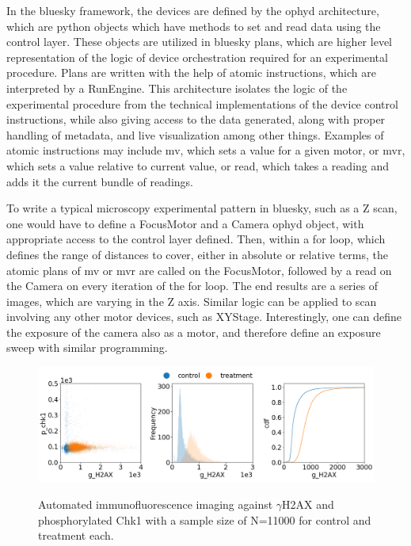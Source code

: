 In the bluesky framework, the devices are defined by the ophyd architecture, which are python objects which have methods to set and read data using the control layer. These objects are utilized in bluesky plans, which are higher level representation of the logic of device orchestration required for an experimental procedure. Plans are written with the help of atomic instructions, which are interpreted by a RunEngine. This architecture isolates the logic of the experimental procedure from the technical implementations of the device control instructions, while also giving access to the data generated, along with proper handling of metadata, and live visualization among other things. Examples of atomic instructions may include mv, which sets a value for a given motor, or mvr, which sets a value relative to current value, or read, which takes a reading and adds it the current bundle of readings.

To write a typical microscopy experimental pattern in bluesky, such as a Z scan, one would have to define a FocusMotor and a Camera ophyd object, with appropriate access to the control layer defined. Then, within a for loop, which defines the range of distances to cover, either in absolute or relative terms, the atomic plans of mv or mvr are called on the FocusMotor, followed by a read on the Camera on every iteration of the for loop. The end results are a series of images, which are varying in the Z axis. Similar logic can be applied to scan involving any other motor devices, such as XYStage. Interestingly, one can define the exposure of the camera also as a motor, and therefore define an exposure sweep with similar programming.


\begin{figure}[H]
    {\hfill\includegraphics[clip, width=1\linewidth]{figures/ncs.png}\hspace*{\fill}}
    \caption{Automated immunofluorescence imaging against $\gamma$H2AX and phosphorylated Chk1 with a sample size of N=11000 for control and treatment each.}
    {\label{fig:ncs}}
\end{figure}

